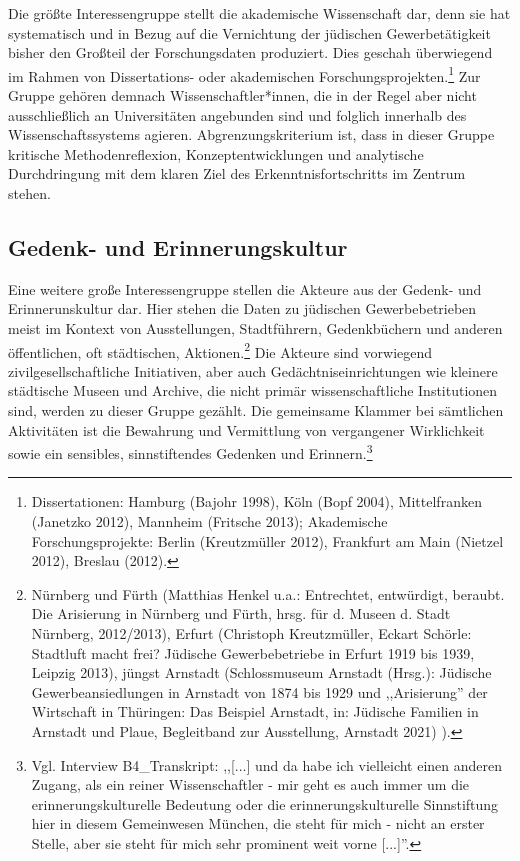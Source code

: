 Die größte Interessengruppe stellt die akademische Wissenschaft dar, denn sie hat systematisch und in Bezug auf die Vernichtung der jüdischen Gewerbetätigkeit  bisher den Großteil der Forschungsdaten produziert. Dies geschah überwiegend im Rahmen von Dissertations- oder akademischen Forschungsprojekten.\footnote{Dissertationen: Hamburg (Bajohr 1998), Köln (Bopf 2004), Mittelfranken (Janetzko 2012), Mannheim (Fritsche 2013); Akademische Forschungsprojekte: Berlin (Kreutzmüller 2012), Frankfurt am Main (Nietzel 2012), Breslau (2012).} Zur Gruppe gehören demnach Wissenschaftler*innen, die in der Regel aber nicht ausschließlich an Universitäten angebunden sind und folglich innerhalb des Wissenschaftssystems agieren. Abgrenzungskriterium ist, dass in dieser Gruppe kritische Methodenreflexion, Konzeptentwicklungen und analytische Durchdringung mit dem klaren Ziel des Erkenntnisfortschritts im Zentrum stehen. 

\subsection{Gedenk- und Erinnerungskultur}

Eine weitere große Interessengruppe stellen die Akteure aus der Gedenk- und Erinnerunskultur dar. Hier stehen die Daten zu jüdischen Gewerbebetrieben meist im Kontext von Ausstellungen, Stadtführern, Gedenkbüchern und anderen öffentlichen, oft städtischen, Aktionen.\footnote{Nürnberg und Fürth (Matthias Henkel u.a.: Entrechtet, entwürdigt, beraubt. Die Arisierung in Nürnberg und Fürth, hrsg. für d. Museen d. Stadt Nürnberg, 2012/2013), Erfurt (Christoph Kreutzmüller, Eckart Schörle: Stadtluft macht frei? Jüdische Gewerbebetriebe in Erfurt 1919 bis 1939, Leipzig 2013), jüngst Arnstadt (Schlossmuseum Arnstadt (Hrsg.): Jüdische Gewerbeansiedlungen in Arnstadt von 1874 bis 1929 und ,,Arisierung'' der Wirtschaft in Thüringen: Das Beispiel Arnstadt, in: Jüdische Familien in Arnstadt und Plaue, Begleitband zur Ausstellung, Arnstadt 2021)
).} Die Akteure sind vorwiegend zivilgesellschaftliche Initiativen, aber auch Gedächtniseinrichtungen wie kleinere städtische Museen und Archive, die nicht primär wissenschaftliche Institutionen sind, werden zu dieser Gruppe gezählt. Die gemeinsame Klammer bei sämtlichen Aktivitäten ist die Bewahrung und Vermittlung von vergangener Wirklichkeit sowie ein sensibles, sinnstiftendes Gedenken und Erinnern.\footnote{Vgl. Interview B4\_Transkript: ,,[...] und da habe ich vielleicht einen anderen Zugang, als ein reiner Wissenschaftler - mir geht es auch immer um die erinnerungskulturelle Bedeutung oder die erinnerungskulturelle Sinnstiftung hier in diesem Gemeinwesen München, die steht für mich - nicht an erster Stelle, aber sie steht für mich sehr prominent weit vorne [...]''.}

